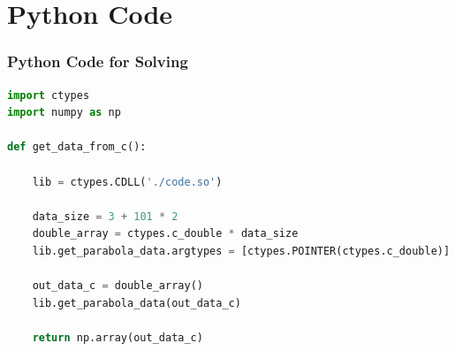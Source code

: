 \documentclass{beamer}
\theoremstyle{remark}
\numberwithin{equation}{section}
\begin{document}
\section{Python Code}
\begin{frame}[fragile]
\frametitle{Python Code for Solving}
\begin{lstlisting}[language=Python]
import ctypes
import numpy as np

def get_data_from_c():

    lib = ctypes.CDLL('./code.so')

    data_size = 3 + 101 * 2
    double_array = ctypes.c_double * data_size
    lib.get_parabola_data.argtypes = [ctypes.POINTER(ctypes.c_double)]

    out_data_c = double_array()
    lib.get_parabola_data(out_data_c)

    return np.array(out_data_c)


\end{lstlisting}
\end{frame}
\end{document}
